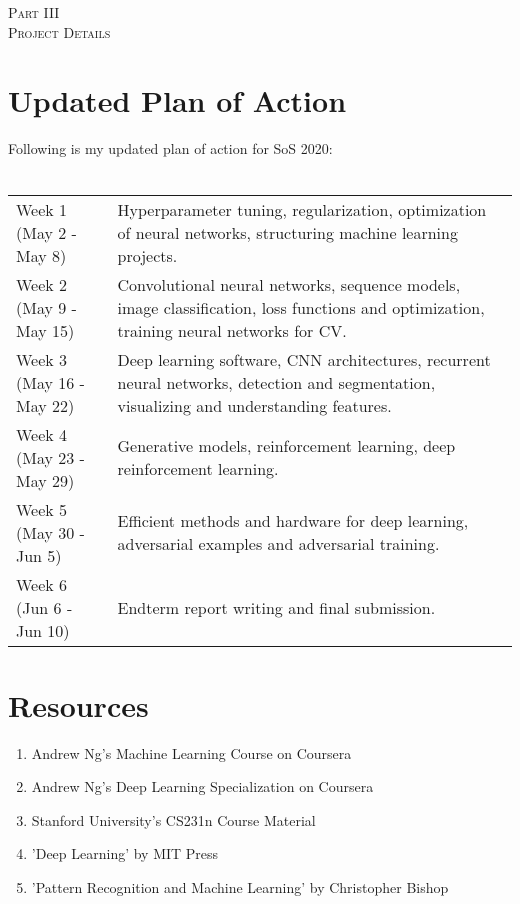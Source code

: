 \documentclass[a4paper, 12pt]{article}
\begin{document}
\newpage

\vspace*{\fill}
\begin{center}
{\huge\scshape Part III \\\vspace{1cm} Project Details}
\end{center}
\vspace*{\fill}

\newpage

\section{Updated Plan of Action}
\vspace{0.5cm}
Following is my updated plan of action for SoS 2020: \\
\vspace{0.5cm}\\
\begin{tabular}{p{4.6cm}|p{8.8cm}}
Week 1 (May 2 - May 8)
&
Hyperparameter tuning, regularization, optimization of neural networks, structuring machine learning projects.
\\
[3mm]
Week 2 (May 9 - May 15)
&
Convolutional neural networks, sequence models, image classification, loss functions and optimization, training neural networks for CV.
\\
[3mm]
Week 3 (May 16 - May 22)
&
Deep learning software, CNN architectures, recurrent neural networks, detection and segmentation, visualizing and understanding features.
\\
[3mm]
Week 4 (May 23 - May 29)
&
Generative models, reinforcement learning, deep reinforcement learning.
\\
[3mm]
Week 5 (May 30 - Jun 5)
&
Efficient methods and hardware for deep learning, adversarial examples and adversarial training.
\\
[3mm]
Week 6 (Jun 6 - Jun 10)
&
Endterm report writing and final submission.
\\
\end{tabular}
\vspace{2cm}

\section{Resources}
\begin{enumerate}
\item Andrew Ng's Machine Learning Course on Coursera
\item Andrew Ng's Deep Learning Specialization on Coursera
\item Stanford University's CS231n Course Material
\item 'Deep Learning' by MIT Press
\item 'Pattern Recognition and Machine Learning' by Christopher Bishop
\end{enumerate}
\end{document}

